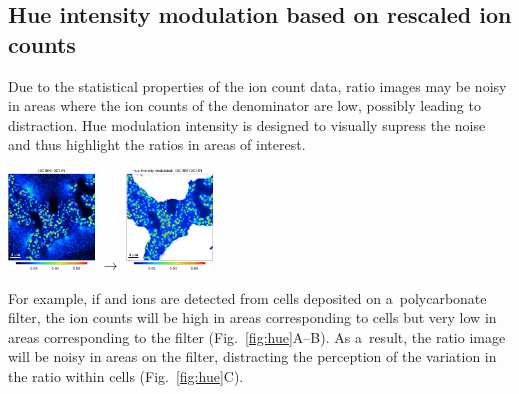 \subsection{Hue intensity modulation based on rescaled ion counts}
\setcounter{step}{0}

\goldbox{}
\begin{minipage}[c]{0.6\textwidth}
Due to the statistical properties of the ion count data, ratio images may be noisy in areas where the ion counts of the denominator are low, possibly leading to distraction. Hue modulation intensity is designed to visually supress the noise and thus highlight the ratios in areas of interest. 
\end{minipage}\hfill
\begin{minipage}[c]{0.35\textwidth}
\includegraphics[width=2.3cm, valign=c]{figs6/12C15N-12C14N}
$\rightarrow$
\includegraphics[width=2.3cm, valign=c]{figs6/12C15N-12C14Nc}
\end{minipage}

\tcbe

For example, if  and  ions are detected from cells deposited on a~polycarbonate filter, the ion counts will be high in areas corresponding to cells but very low in areas corresponding to the filter (Fig.~\ref{fig:hue}A--B). As a~result, the ratio image  will be noisy in areas on the filter, distracting the perception of the variation in the  ratio within cells (Fig.~\ref{fig:hue}C). 

